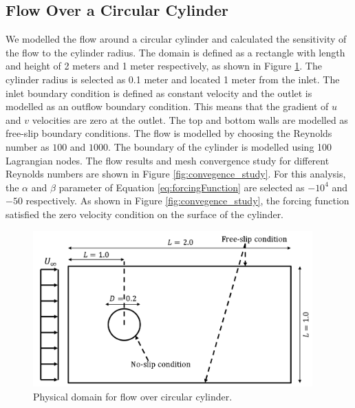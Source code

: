 \documentclass[12pt]{aiaa-pretty}
\begin{document}
\subsection{Flow Over a Circular Cylinder}
We modelled the flow around a circular cylinder and calculated the sensitivity of the flow to the cylinder radius. The domain is defined as a rectangle with length and height of 2 meters and 1 meter respectively, as shown in Figure \ref{fig:cylinderDomain}. The cylinder radius is selected as 0.1 meter and located 1 meter from the inlet. The inlet boundary condition is defined as constant velocity and the outlet is modelled as an outflow boundary condition. This means that the gradient of $u$ and $v$ velocities are zero at the outlet. The top and bottom walls are modelled as free-slip boundary conditions. The flow is modelled by choosing the Reynolds number as $100$ and $1000$. The boundary of the cylinder is modelled using 100 Lagrangian nodes. The flow results and mesh convergence study for different Reynolds numbers are shown in Figure \ref{fig:convegence_study}. For this analysis, the $\alpha$ and $\beta$ parameter of Equation \eqref{eq:forcingFunction} are selected as $-10^4$ and $-50$ respectively. As shown in Figure \ref{fig:convegence_study}, the forcing function satisfied the zero velocity condition on the surface of the cylinder.

%
\begin{figure}[H]
	\centering
	\includegraphics[height=6.0cm]{figure/cylinder/domain.png}
	\caption{Physical domain for flow over circular cylinder.}
	\label{fig:cylinderDomain}
\end{figure}
%
\end{document}
